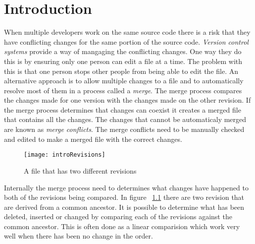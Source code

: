 
\chapter{Introduction}\label{C:intro}

When multiple developers work on the same source code there is a risk that they have conflicting changes for the same portion of the source code. \emph{Version control systems} provide a way of mangaging the conflicting changes. One way they do this is by ensuring only one person can edit a file at a time. The problem with this is that one person stops other people from being able to edit the file. An alternative approach is to allow multiple changes to a file and to automatically resolve most of them in a process called a \emph{merge}.  The merge process compares the changes made for one version with the changes made on the other revision. If the merge process determines that changes can coexist it creates a merged file that contains all the changes. The changes that cannot be automaticaly merged are known as \emph{merge conflicts}.  The merge conflicts need to be manually checked and edited to make a merged file with the correct changes.

\begin{figure}[h]
 \begin{center}
 \texttt{[image: introRevisions]}
 \end{center}
 \caption{A file that has two different revisions}
 \label{fig:introRevisions}
\end{figure}


Internally the merge process need to determines what changes have happened to both of the revisions being compared.   In figure  ~\ref{fig:introRevisions} there are two revision that are derived from a common ancestor. It is possible to determine what has been deleted, inserted or changed by comparing each of the revisions against the common ancestor.  This is often done as a linear comparision which work very well when there has been no change in the order.


